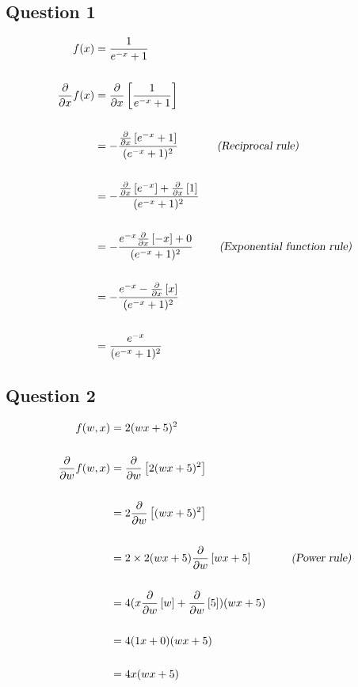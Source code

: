 \documentclass{article}
\begin{document}
\subsection{Question 1}
\begin{align*}
f(x) &= \dfrac{1}{e^{-x} +1} \\ \\
\frac{\partial}{\partial x} f(x) &=  \frac{\partial}{\partial x}
  \left[\dfrac{1}{e^{-x} +1}\right] \\ \\
&= - \dfrac{ \frac{\partial}{\partial x} \left[e^{-x}+1 \right] }
           {(e^{-x}+1)^2} \textsl{  \hspace{1cm}  (Reciprocal rule)}\\ \\
&= - \dfrac{\frac{\partial}{\partial x} \left[e^{-x} \right] + \frac{\partial}{\partial x} \left[1 \right]}
           {(e^{-x}+1)^2}\\ \\
&= - \dfrac{ e^{-x} \frac{\partial}{\partial x} \left[-x \right] +0}
           {(e^{-x}+1)^2} \textsl{  \hspace{0,6cm}  (Exponential function rule)} \\ \\
&= - \dfrac{ e^{-x} -\frac{\partial}{\partial x} \left[x \right]}
           {(e^{-x}+1)^2} \\ \\
&= \dfrac{ e^{-x} }
           {(e^{-x}+1)^2}
\end{align*}
\subsection{Question 2}
\begin{align*}
f(w,x) &= 2 (wx+5)^2 \\ \\
\frac{\partial}{\partial w} f(w,x) &= \frac{\partial}{\partial w} \left[2(wx+5)^2\right] \\ \\
&= 2 \frac{\partial}{\partial w} \left[(wx+5)^2\right] \\ \\
&= 2 \times 2 (wx+5) \frac{\partial}{\partial w} \left[wx+5\right] \textsl{  \hspace{1cm}  (Power rule)} \\ \\
&= 4 (x \frac{\partial}{\partial w} \left[ w \right] + \frac{\partial}{\partial w} \left[ 5 \right]) (wx+5)\\ \\
&= 4(1x+0)(wx+5) \\ \\
&= 4x(wx+5) \\ \\
\end{align*}
\end{document}
